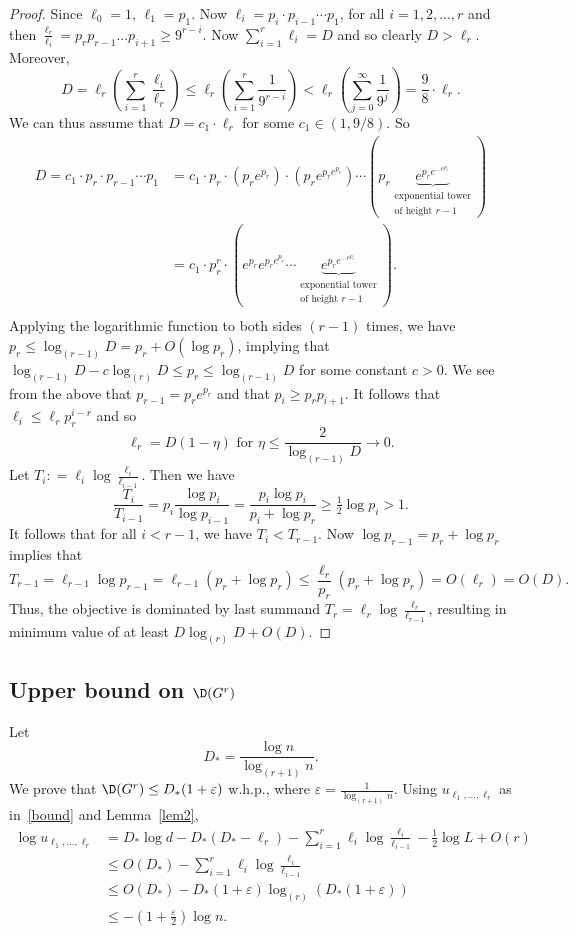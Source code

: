 \documentclass[12pt,a4paper]{article}
\def\e{\varepsilon} \def\f{\phi} \def\F{{\Phi}} \def\vp{\varphi} \def\g{\gamma}
\newcommand{\brac}[1]{\left(#1\right)}
\newcommand{\ra}{\rightarrow}
\theoremstyle{plain}
\begin{document}
\begin{proof}
Since $\ell_0=1$, $\ell_1=p_1$. Now $\ell_i = p_i\cdot p_{i-1}\cdots p_1$, for all $i=1,2,...,r$ and then $\frac{\ell_r}{\ell_i} = p_rp_{r-1}...p_{i+1} \geq 9^{r-i}$. Now $\sum\limits_{i=1}^r \ell_i = D$ and so clearly $D > \ell_r$. Moreover, 
\[
D = \ell_r \left(\sum\limits_{i=1}^r \frac{\ell_i}{\ell_r}\right) \leq \ell_r \left(\sum\limits_{i=1}^r \frac{1}{9^{r-i}}\right) < \ell_r\left(\sum\limits_{j=0}^\infty \frac{1}{9^j}\right) = \frac{9}{8}\cdot \ell_r. 
\]
We can thus assume that $D = c_1 \cdot \ell_r$ for some $c_1 \in (1,9/8)$. So
\begin{align*}
D= c_1 \cdot p_r \cdot p_{r-1} \cdots p_1 & = c_1 \cdot p_r \cdot \left(p_r e^{p_r}\right) \cdot\left(p_r e^{p_r e^{p_r}}\right) \cdots \left(p_r \underbrace{e^{p_r e^{... e^{p_r}}}}_{\substack{\text{exponential tower}\\\text{of height }r-1}}\right)\\
		& = c_1 \cdot p_r^r \cdot \left(e^{p_r} e^{p_r e^{p_r}} \cdots \underbrace{e^{p_r e^{... e^{p_r}}}}_{\substack{\text{exponential tower}\\\text{of height }r-1}} \right).\\
\end{align*}
Applying the logarithmic function to both sides $(r-1)$ times, we have $p_r\leq \log_{(r-1)} D = p_r + O(\log p_r)$, implying that $\log_{(r-1)}D-c\log_{(r)}D\leq p_r\leq \log_{(r-1)}D$ for some constant $c>0$. We see from the above that $p_{r-1}=p_re^{p_r}$ and that $p_i\geq p_rp_{i+1}$. It follows that $\ell_i\leq \ell_rp_r^{i-r}$ and so 
\[
\ell_r = D(1-\eta)\text{ for }\eta \leq \frac{2}{\log_{(r-1)}D} \ra 0.
\]
 Let $T_i : = \ell_i\log\frac{\ell_i}{\ell_{i-1}}$. Then we have 
\[
\frac{T_i}{T_{i-1}}=p_i\frac{\log p_i}{\log p_{i-1}}=\frac{p_i\log p_i}{p_i+\log p_r}\geq \tfrac12\log p_i>1.
\]
It follows that for all $i<r-1$, we have $T_i <T_{r-1}$. Now $\log p_{r-1} = p_r + \log p_r$ implies that 
\[
T_{r-1} = \ell_{r-1}\log p_{r-1}=\ell_{r-1}(p_r + \log p_r)\leq \frac{\ell_r}{p_r}(p_r + \log p_r)  = O(\ell_r) = O(D).
\]
Thus, the objective is dominated by last summand $T_r = \ell_r\log\frac{\ell_r}{\ell_{r-1}}$, resulting in minimum value of at least $D\log_{(r)}D+O(D)$.
 \end{proof}

\subsection{Upper bound on $\D(G^r)$}\label{sec3.1}
Let 
\[
D_* = \frac{\log n}{\log_{(r+1)} n}.
\]
We prove that $\D(G^r) \leq D_*(1+\e)$ w.h.p., where $\e=\frac{1}{\log_{(r+1)}n}$.  
Using $u_{\ell_1,...,\ell_r}$ as in~\eqref{bound} and Lemma~\ref{lem2},
\begin{align*}
	\log u_{\ell_1,...,\ell_r} 
	&= D_* \log d - D_*(D_*-\ell_r) - \sum\limits_{i=1}^r \ell_i \log\frac{\ell_i}{\ell_{i-1}} -\tfrac12\log L+O(r) \\
	&\leq O(D_*)-\sum\limits_{i=1}^r \ell_i \log\frac{\ell_i}{\ell_{i-1}} \\
	& \leq O(D_*)-D_*(1+\e) \log_{(r)} (D_*(1+\e))\\
	&\leq -\brac{1+\frac{\e}2}\log n.
\end{align*}
\end{document}
